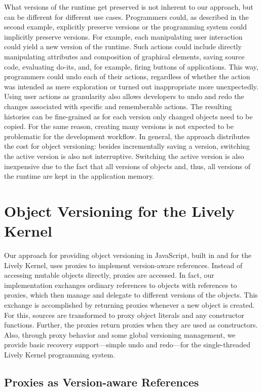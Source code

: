 What versions of the runtime get preserved is not inherent to our approach, but can be different for different use cases.
Programmers could, as described in the second example, explicitly preserve versions or the programming system could implicitly preserve versions.
For example, each manipulating user interaction could yield a new version of the runtime.
Such actions could include directly manipulating attributes and composition of graphical elements, saving source code, evaluating do-its, and, for example, firing buttons of applications.
This way, programmers could undo each of their actions, regardless of whether the action was intended as mere exploration or turned out inappropriate more unexpectedly.
Using user actions as granularity also allows developers to undo and redo the changes associated with specific and rememberable actions.
The resulting histories can be fine-grained as for each version only changed objects need to be copied.
For the same reason, creating many versions is not expected to be problematic for the development workflow.
In general, the approach distributes the cost for object versioning: besides incrementally saving a version, switching the active version is also not interruptive.
Switching the active version is also inexpensive due to the fact that all versions of objects and, thus, all versions of the runtime are kept in the application memory.


\section{Object Versioning for the Lively Kernel} \label{sec:APPROACH:2}

Our approach for providing object versioning in JavaScript, built in and for the Lively Kernel, uses proxies to implement version-aware references.
Instead of accessing mutable objects directly, proxies are accessed.
In fact, our implementation exchanges ordinary references to objects with references to proxies, which then manage and delegate to different versions of the objects.
This exchange is accomplished by returning proxies whenever a new object is created.
For this, sources are transformed to proxy object literals and any constructor functions.
Further, the proxies return proxies when they are used as constructors.
Also, through proxy behavior and some global versioning management, we provide basic recovery support---simple undo and redo---for the single-threaded Lively Kernel programming system.


\subsection{Proxies as Version-aware References}

